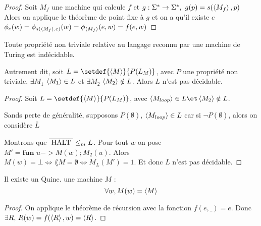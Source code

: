 \begin{proof}
	Soit $M_f$ une machine qui calcule $f$ et $g : \Sigma^{*} \to \Sigma^{*}, \ g(p) = s(\left\langle M_f\right\rangle, p)$
	Alors on applique le théorème de point fixe à $g$ et on a qu'il existe $e$ \tq $\phi_e(w)
		=\phi_{s(\left\langle M_f\right\rangle,e)} (w) = \phi_{\left\langle M_f\right\rangle} (e,w) = f(e,w)$
\end{proof}


\begin{theorem}[de Rice]
	Toute propriété non triviale relative au langage reconnu par une machine de Turing est indécidable.

	Autrement dit, soit $L = \setdef {\encode M} {P(L_M)}$, avec $P$ une propriété non triviale, \ie $\exists M_1$ \tq
	$\left\langle M_1\right\rangle \in L$ et $\exists M_2$ \tq $\left\langle M_2\right\rangle \notin L$. Alors $L$ n'est pas décidable.
\end{theorem}


\begin{proof}
	Soit $L = \setdef {\encode M} {P(L_M)}$, avec $\encode {M_{loop}} \in L \et \encode{M_2} \notin L$.

	Sands perte de généralité, supposons $P(\emptyset)$, \ie $\left\langle M_{loop}\right\rangle \in L$ car si
	$\lnot P (\emptyset)$, alors on considère $\bar L$ %

	Montrons que $\overline {\text{ HALT }} \leq_m L$.
	Pour tout $w$ on pose $M' = \textbf{fun } u -> M(w); M_2(u)$. Alors $M(w) = \bot \iff \lang M = \emptyset \iff M_L (M') = 1$.
	Et donc $L$ n'est pas décidable.
\end{proof}



\begin{prop}
    Il existe un Quine. \ie une machine $M$ \tq : 
    $$\forall w, M(w) = \left\langle M\right\rangle$$
\end{prop}

\begin{proof}
    On applique le théorème de récursion avec la fonction $f(e, \_) = e$. Donc $\exists R, \, R(w) = f(\left\langle R\right\rangle, w) = \left\langle R\right\rangle$.
\end{proof}

